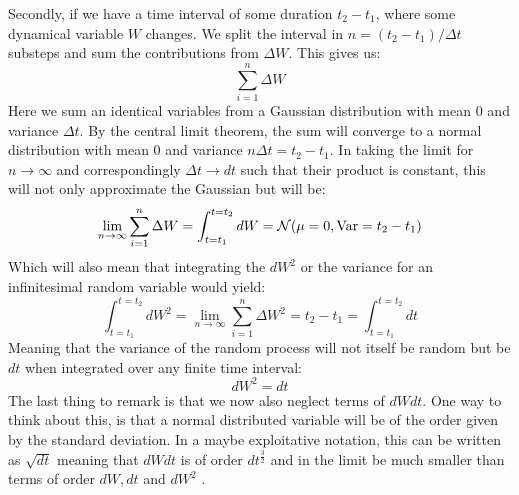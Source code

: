 Secondly, if we have a time interval of some duration $t_2 - t_1$, where some dynamical variable $W$ changes. We split the interval in $n = (t_2 - t_1)/\Delta t$ substeps and sum the contributions from $\Delta W$. This gives us:
\begin{equation}
    \sum_{i=1}^n \Delta W
\end{equation}
Here we sum an identical variables from a Gaussian distribution with mean $0$ and variance $\Delta t$. By the central limit theorem, the sum will converge to a normal distribution with mean $0$ and variance $n \Delta{t} = t_2 - t_1$. In taking the limit for $n \to \infty$ and correspondingly $\Delta t \to dt$ such that their product is constant, this will not only approximate the Gaussian but will be:
\begin{equation}
    \lim_{n \to \infty} \sum_{i=1}^n \Delta W = \int_{t = t_1}^{t = t_2} dW = \mathcal{N}(\mu = 0, \operatorname{Var} = t_2 - t_1)
\end{equation}
Which will also mean that integrating the $dW^2$ or the variance for an infinitesimal random variable would yield:
\begin{equation}
    \int_{t = t_1}^{t = t_2} dW^2 =  \lim_{n \to \infty} \sum_{i=1}^n \Delta W^2 = t_2 - t_1 = \int_{t = t_1}^{t = t_2} dt
\end{equation}
Meaning that the variance of the random process will not itself be random but be $dt$ when integrated over any finite time interval: 
\begin{equation}
    dW^2 = dt
\end{equation}
The last thing to remark is that we now also neglect terms of $dWdt$. One way to think about this, is that a normal distributed variable will be of the order given by the standard deviation. In a maybe exploitative notation, this can be written as $\sqrt{dt}$ meaning that $dWdt$ is of order $dt^\frac32$ and in the limit be much smaller than terms of order $dW, dt$ and $dW^2$ \cite{gheorghiu_ito_nodate}.






